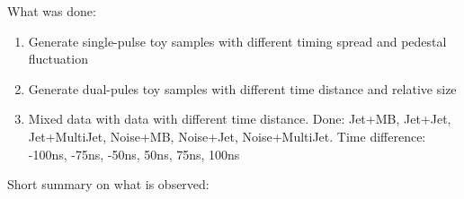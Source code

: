 

What was done:

\begin{enumerate}
\item Generate single-pulse toy samples with different timing spread and pedestal fluctuation
\item Generate dual-pules toy samples with different time distance and relative size
\item Mixed data with data with different time distance.  Done: Jet+MB, Jet+Jet, Jet+MultiJet, Noise+MB, Noise+Jet, Noise+MultiJet.  Time difference: -100ns, -75ns, -50ns, 50ns, 75ns, 100ns
\end{enumerate}


Short summary on what is observed:

